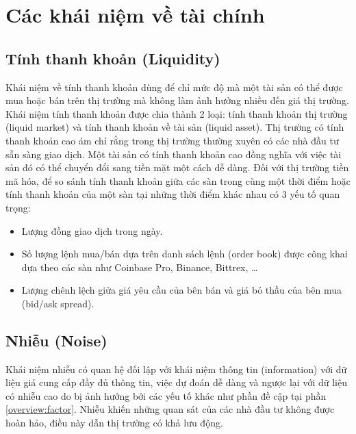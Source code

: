\section{Các khái niệm về tài chính}
\subsection{Tính thanh khoản (Liquidity)}

Khái niệm về tính thanh khoản dùng để chỉ mức độ mà một tài sản có thể được mua hoặc bán trên thị trường mà không làm ảnh hưởng nhiều đến giá thị trường.
Khái niệm tính thanh khoản được chia thành 2 loại: tính thanh khoản thị trường (liquid market) và tính thanh khoản về tài sản (liquid asset). Thị trường có tính thanh khoản cao ám chỉ rằng trong thị trường thường xuyên có các nhà đầu tư sẵn sàng giao dịch. Một tài sản có tính thanh khoản cao đồng nghĩa với việc tài sản đó có thể chuyển đổi sang tiền mặt một cách dễ dàng. Đối với thị trường tiền mã hóa, để so sánh tính thanh khoản giữa các sàn trong cùng một thời điểm hoặc tính thanh khoản của một sàn tại những thời điểm khác nhau có 3 yếu tố quan trọng: 
\begin{itemize}
	\item Lượng đồng giao dịch trong ngày.
	\item Số lượng lệnh mua/bán dựa trên danh sách lệnh (order book) được công khai dựa theo các sàn như Coinbase Pro\cite{live-order-book}, Binance, Bittrex, \dots
	\item Lượng chênh lệch giữa giá yêu cầu của bên bán và giá bỏ thầu của bên mua (bid/ask spread).
\end{itemize}

\subsection{Nhiễu (Noise)}
Khái niệm nhiễu có quan hệ đối lập với khái niệm thông tin (information) với dữ liệu giá cung cấp đầy đủ thông tin, việc dự đoán dễ dàng và ngược lại với dữ liệu có nhiễu cao do bị ảnh hưởng bởi các yếu tố khác như phần đề cập tại phần \ref{overview:factor}. Nhiễu khiến những quan sát của các nhà đầu tư không được hoàn hảo, điều này dẫn thị trường có khả lưu động\cite{noise-finance}.
